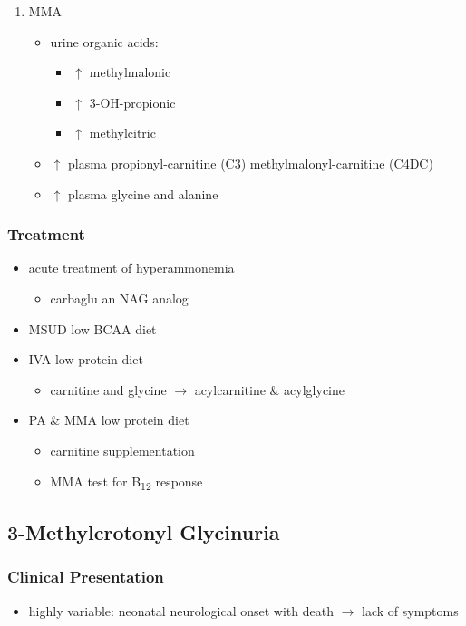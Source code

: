 \documentclass[12pt]{scrartcl}
\begin{document}
\begin{enumerate}
\item MMA
\label{sec:orgae67ed4}
\begin{itemize}
\item urine organic acids:
\begin{itemize}
\item \(\uparrow\) methylmalonic
\item \(\uparrow\) 3-OH-propionic
\item \(\uparrow\) methylcitric
\end{itemize}
\item \(\uparrow\) plasma propionyl-carnitine (C3) \textpm{} methylmalonyl-carnitine (C4DC)
\item \(\uparrow\) plasma glycine and alanine
\end{itemize}
\end{enumerate}

\subsubsection{Treatment}
\label{sec:orga60c554}
\begin{itemize}
\item acute treatment of hyperammonemia
\begin{itemize}
\item carbaglu an NAG analog
\end{itemize}
\item MSUD low BCAA diet
\item IVA low protein diet
\begin{itemize}
\item carnitine and glycine \(\to\) acylcarnitine \& acylglycine
\end{itemize}
\item PA \& MMA low protein diet
\begin{itemize}
\item carnitine supplementation
\item MMA test for B\textsubscript{12} response
\end{itemize}
\end{itemize}

\subsection{3-Methylcrotonyl Glycinuria}
\label{sec:org07d04d8}
\subsubsection{Clinical Presentation}
\label{sec:org09dfdd5}
\begin{itemize}
\item highly variable: neonatal neurological onset with death \(\to\) lack of symptoms
\end{itemize}
\end{document}
